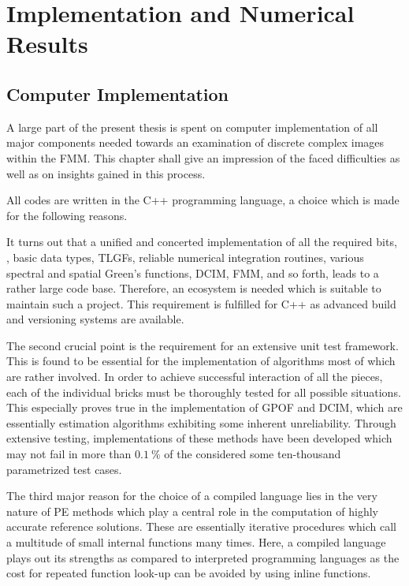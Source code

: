 \part{Implementation and Numerical Results}
\label{part:implementation_and_results}






\chapter{Computer Implementation}
\label{ch:computer_implementation}

A large part of the present thesis is spent on computer implementation of
all major components needed towards an examination of discrete complex images
within the \ac{FMM}.
This chapter shall give an impression of the faced difficulties as well as
on insights gained in this process.

All codes are written in the C++ programming language, a choice which is made
for the following reasons.

It turns out that a unified and concerted implementation of all the
required bits, \eg, basic data types, \acp{TLGF}, reliable numerical
integration routines, various spectral and spatial Green's functions,
\ac{DCIM}, \ac{FMM}, and so forth, leads to a rather large code base.
Therefore, an ecosystem is needed which is suitable to maintain such a
project.
This requirement is fulfilled for C++ as advanced build and versioning systems
are available.

The second crucial point is the requirement for an extensive unit test
framework.
This is found to be essential for the implementation of algorithms most of
which are rather involved.
In order to achieve successful interaction of all the pieces, each of the
individual bricks must be thoroughly tested for all possible situations.
This especially proves true in the implementation of \ac{GPOF} and
\ac{DCIM}, which are essentially estimation algorithms exhibiting some inherent
unreliability.
Through extensive testing, implementations of these methods have been developed
which may not fail in more than $\SI{0.1}{\percent}$ of
the considered some ten-thousand parametrized test cases.

The third major reason for the choice of a compiled language lies in the very
nature of \ac{PE} methods which play a central role in the computation
of highly accurate reference solutions.
These are essentially iterative procedures which call a multitude of
small internal functions many times.
Here, a compiled language plays out its strengths as compared to interpreted
programming languages as the cost for repeated function look-up can be avoided
by using inline functions.





